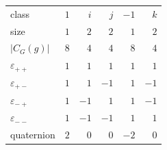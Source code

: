 \begin{tabular}{lrrrrr}
\toprule
class & $1$ & $i$ & $j$ & $-1$ & $k$ \\
size & $1$ & $2$ & $2$ & $1$ & $2$ \\
$|C_G(g)|$ & $8$ & $4$ & $4$ & $8$ & $4$ \\
\midrule
$\varepsilon_{++}$ & $1$ & $1$ & $1$ & $1$ & $1$ \\
$\varepsilon_{+-}$ & $1$ & $1$ & $-1$ & $1$ & $-1$ \\
$\varepsilon_{-+}$ & $1$ & $-1$ & $1$ & $1$ & $-1$ \\
$\varepsilon_{--}$ & $1$ & $-1$ & $-1$ & $1$ & $1$ \\
quaternion & $2$ & $0$ & $0$ & $-2$ & $0$ \\
\bottomrule
\end{tabular}
